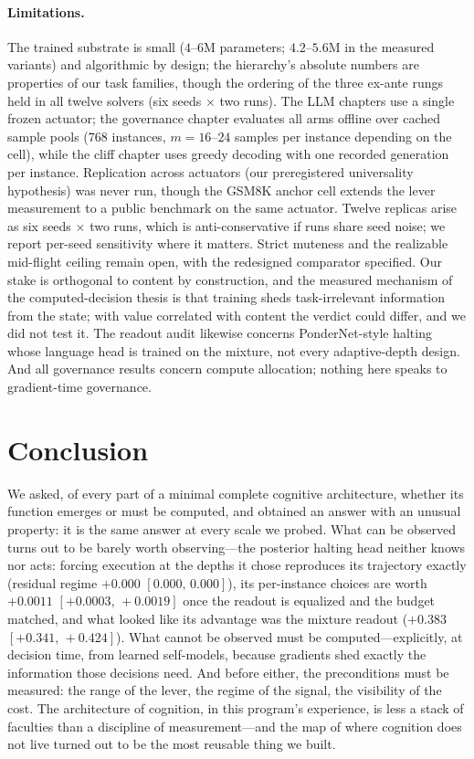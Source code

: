 \documentclass{article}
\newcommand{\Rlectura}{$+0.383$} \newcommand{\RlecturaIC}{$[+0.341,\,+0.424]$}
\newcommand{\Rregimen}{$+0.000$} \newcommand{\RregimenIC}{$[0.000,\,0.000]$}
\newcommand{\Rasign}{$+0.0011$} \newcommand{\RasignIC}{$[+0.0003,\,+0.0019]$}
\begin{document}
\paragraph{Limitations.} The trained substrate is small ($4$--$6$M parameters;
$4.2$--$5.6$M in the measured variants)
and algorithmic by design; the hierarchy's absolute numbers are properties
of our task families, though the ordering of the three ex-ante rungs held in
all twelve solvers (six seeds $\times$ two runs).
The LLM chapters use a single frozen actuator; the governance chapter
evaluates all arms offline over cached sample pools ($768$ instances,
$m{=}16$--$24$ samples per instance depending on the cell), while the cliff chapter uses greedy
decoding with one recorded generation per instance. Replication across
actuators (our preregistered universality hypothesis) was never run,
though the GSM8K anchor cell extends the lever measurement to a public
benchmark on the same actuator. Twelve replicas arise as six seeds
$\times$ two runs, which is anti-conservative if runs share seed noise; we
report per-seed sensitivity where it matters. Strict muteness and the
realizable mid-flight ceiling remain open, with the redesigned comparator
specified. Our stake is orthogonal to content by construction, and the
measured mechanism of the computed-decision thesis is that training sheds
task-irrelevant information from the state; with value correlated with content
the verdict could differ, and we did not test it. The readout audit likewise
concerns PonderNet-style halting whose language head is trained on the
mixture, not every adaptive-depth design. And all governance results concern
compute allocation; nothing here speaks to gradient-time governance.

\section{Conclusion}

We asked, of every part of a minimal complete cognitive architecture,
whether its function emerges or must be computed, and obtained an answer
with an unusual property: it is the same answer at every scale we probed.
What can be observed turns out to be barely worth observing---the posterior
halting head neither knows nor acts: forcing execution at the depths it chose
reproduces its trajectory exactly (residual regime \Rregimen{} \RregimenIC),
its per-instance choices are worth \Rasign{} \RasignIC{} once the readout is
equalized and the budget matched, and what looked like its advantage was the
mixture readout (\Rlectura{} \RlecturaIC). What cannot be observed must be
computed---explicitly, at decision time, from learned self-models, because
gradients shed exactly the information those decisions need. And before
either, the preconditions must be measured: the range of the lever, the
regime of the signal, the visibility of the cost. The architecture of
cognition, in this program's experience, is less a stack of faculties than
a discipline of measurement---and the map of where cognition does not live
turned out to be the most reusable thing we built.
\end{document}
